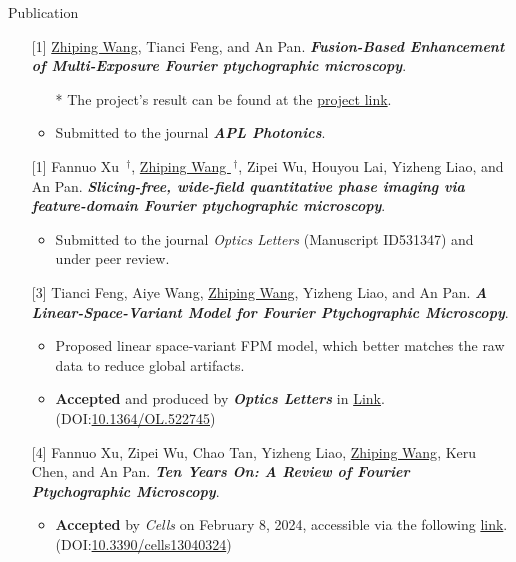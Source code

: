 \documentclass[]{kyvernitis-resume}
\begin{document}
\begin{section}{\Large Publication}
\begin{itemize}
    
    \item[{[1]}] \underline{Zhiping Wang}, Tianci Feng, and An Pan. \emph{\textbf{Fusion-Based Enhancement of Multi-Exposure Fourier ptychographic microscopy}}.
     \begin{itemize}
         \item[*] The project's result can be found at the \href{https://wang-zhiping.github.io/ResearchSummary&Reporting/FPM/fusion.html}{project link}.
    \item Submitted to the journal \emph{\textbf{APL Photonics}}.
    \end{itemize}

    \item[{[1]}] Fannuo Xu $\,^{\dag}$, \underline{Zhiping Wang $\,^{\dag}$}, Zipei Wu, Houyou Lai, Yizheng Liao, and An Pan. \emph{\textbf{Slicing-free, wide-field quantitative phase imaging via feature-domain Fourier ptychographic microscopy}}.

    \begin{itemize}
   \item Submitted to the journal \emph{{Optics Letters}} (Manuscript ID531347) and under peer review.
   \end{itemize}


 \item[{[3]}] Tianci Feng, Aiye Wang, \underline{Zhiping Wang}, Yizheng Liao, and An Pan. \emph{\textbf{A Linear-Space-Variant Model for Fourier Ptychographic Microscopy}}.
    \begin{itemize}
    \item Proposed linear space-variant FPM model, which better matches the raw data to reduce global artifacts.
    \item \textbf{Accepted} and produced by \emph{\textbf{Optics Letters}} in \href{https://opg.optica.org/ol/abstract.cfm?doi=10.1364/OL.522745}{Link}. (DOI:\href{http://dx.doi.org/10.1364/OL.522745 }{10.1364/OL.522745})


    \end{itemize}

\item[{[4]}] Fannuo Xu, Zipei Wu, Chao Tan, Yizheng Liao, \underline{Zhiping Wang}, Keru Chen, and An Pan. \emph{\textbf{Ten Years On: A Review of Fourier Ptychographic Microscopy}}.
\begin{itemize}
\item \textbf{Accepted} by \emph{Cells} on February 8, 2024, accessible via the following \href{https://www.mdpi.com/2073-4409/13/4/324}{link}.(DOI:\href{hhttps://doi.org/10.3390/cells13040324}{10.3390/cells13040324})
    \end{itemize}




\end{itemize}
\end{section}
\end{document}
